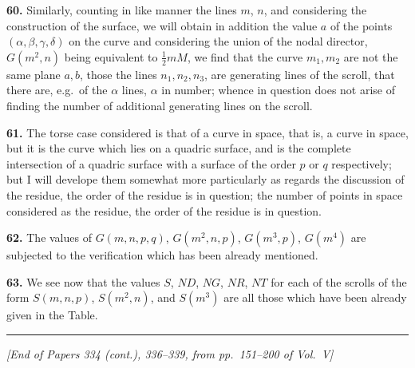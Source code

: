 \documentclass[11pt,a4paper]{article}
\begin{document}
\medskip

\textbf{60.} Similarly, counting in like manner the lines $m$, $n$, and considering the construction of the surface, we will obtain in addition the value $a$ of the points $(\alpha, \beta, \gamma, \delta)$ on the curve and considering the union of the nodal director, $G(m^2, n)$ being equivalent to $\frac{1}{2}m M$, we find that the curve $m_1, m_2$ are not the same plane $a, b$, those the lines $n_1, n_2, n_3$, are generating lines of the scroll, that there are, e.g.\ of the $\alpha$ lines, $\alpha$ in number; whence in question does not arise of finding the number of additional generating lines on the scroll.

\medskip

\textbf{61.} The torse case considered is that of a curve in space, that is, a curve in space, but it is the curve which lies on a quadric surface, and is the complete intersection of a quadric surface with a surface of the order $p$ or $q$ respectively; but I will develope them somewhat more particularly as regards the discussion of the residue, the order of the residue is in question; the number of points in space considered as the residue, the order of the residue is in question.

\medskip

\textbf{62.} The values of $G(m, n, p, q)$, $G(m^2, n, p)$, $G(m^3, p)$, $G(m^4)$ are subjected to the verification which has been already mentioned.

\medskip

\textbf{63.} We see now that the values $S$, $ND$, $NG$, $NR$, $NT$ for each of the scrolls of the form $S(m, n, p)$, $S(m^2, n)$, and $S(m^3)$ are all those which have been already given in the Table.

\bigskip
\noindent\rule{\textwidth}{0.4pt}
\vspace{1em}

\begin{center}
\textit{[End of Papers 334 (cont.), 336--339, from pp.\ 151--200 of Vol.\ V]}
\end{center}
\end{document}

